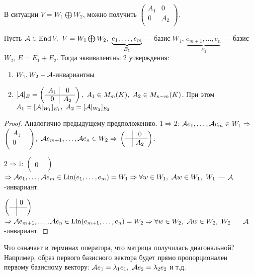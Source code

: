 \documentclass[main]{subfiles}
\begin{document}
В ситуации $V = W_1 \bigoplus W_2$, можно получить $\left(\begin{array}{c|c}
    A_1 & 0   \\ \hline
    0   & A_2 \\
\end{array}\right)$.

\begin{proposition} 
    Пусть $\mca \in \End V,\ V=W_1 \bigoplus W_2,\ 
    \underbrace{e_1, \ldots , e_m}_{E_1}$
    — базис $W_1$, $\underbrace{e_{m+1}, \ldots , e_{n}}_{E_2}$
    — базис $W_2$, $E = E_1+E_2$. Тогда эквивалентны 2 утверждения:
    \begin{enumerate}
        \item $ W_1, W_2 - \mathcal{A} $-инвариантны
        \item $[\mathcal{A}]_E = \left(\begin{array}{c|c}
            A_1 &   0  \\
            \hline
            0   & A_2  \\         
        \end{array}\right),\ A_1 \in M_m(K),\ A_2 \in M_{n-m}(K)$.
        При этом $A_1 = [\mathcal{A}|_{W_1}]_{E_1},\ A_2 = [\mathcal{A}|_{W_2}]_{E_2}$
    \end{enumerate}
\end{proposition}

\begin{proof}
    Аналогично предыдущему предположению. 
    $1 \Rightarrow 2$: 
    $\mathcal{A} e_1, \ldots, \mathcal{A} e_m \in W_1 \Rightarrow$ $\left(\begin{array}{c|c}
    A_1 &    \\
       \hline
    0   &         \\         
    \end{array}\right)$,\
    $\mathcal{A} e_{m+1}, \ldots, \mathcal{A} e_n \in W_2 \Rightarrow$ $\left(\begin{array}{c|c}
         &  0  \\
       \hline
       &   A_2      \\         
    \end{array}\right) $.

    $2\Rightarrow 1$: 
    $\left(\begin{array}{c|c}
     &    \\
       \hline
    0   &         \\         
    \end{array}\right) $ $\Rightarrow \mathcal{A} e_1, \ldots, \mathcal{A} e_m \in \operatorname{Lin}(e_1, \ldots, e_m) = W_1
    \Rightarrow \forall w \in W_1,\ \mathcal{A} w \in W_1,\ W_1$ — $\mathcal{A}$-инвариант.

    $\left(\begin{array}{c|c}
        &   0 \\
          \hline
        &     \\         
       \end{array}\right) $ $\Rightarrow \mathcal{A} e_{m+1}, \ldots, \mathcal{A} e_n \in \operatorname{Lin}(e_{m+1}, \ldots, e_n) = W_2
       \Rightarrow \forall w \in W_2,\ \mathcal{A} w \in W_2,\ W_2$ — $\mathcal{A}$-инвариант.
\end{proof}

Что означает в терминах оператора, что матрица получилась диагональной? Например, образ первого базисного вектора будет 
прямо пропорционален первому базисному вектору: $\mathcal{A} e_1 = \lambda_1 e_1,\ \mathcal{A} e_2 = \lambda_2 e_2$ и т.д.
 
\end{document}

